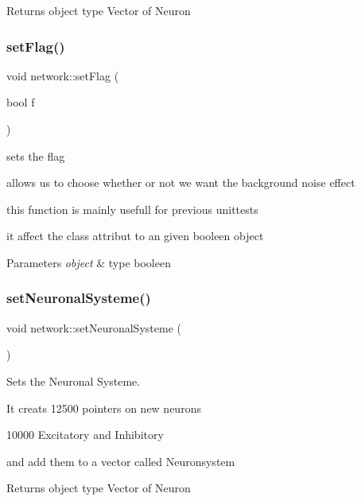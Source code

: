 \begin{DoxyReturn}{Returns}
object type Vector of Neuron 
\end{DoxyReturn}
\mbox{\label{classnetwork_adec3ef8128235b2dc6d4d9df34e211b7}} 
\subsubsection{\texorpdfstring{set\+Flag()}{setFlag()}}
{\footnotesize\ttfamily void network\+::set\+Flag (\begin{DoxyParamCaption}\item[{bool}]{f }\end{DoxyParamCaption})}



sets the flag 

allows us to choose whether or not we want the background noise effect

this function is mainly usefull for previous unittests

it affect the class attribut to an given booleen object


\begin{DoxyParams}{Parameters}
{\em object} & type booleen \\
\hline
\end{DoxyParams}
\mbox{\label{classnetwork_af9105fac7338bbd113d0823f837cf217}} 
\subsubsection{\texorpdfstring{set\+Neuronal\+Systeme()}{setNeuronalSysteme()}}
{\footnotesize\ttfamily void network\+::set\+Neuronal\+Systeme (\begin{DoxyParamCaption}{ }\end{DoxyParamCaption})}



Sets the Neuronal Systeme. 

It creats 12500 pointers on new neurons

10000 Excitatory and Inhibitory

and add them to a vector called Neuronsystem

\begin{DoxyReturn}{Returns}
object type Vector of Neuron 
\end{DoxyReturn}
\mbox{\label{classnetwork_a6dda83ae384498619f0aa876639b2c25}} 
